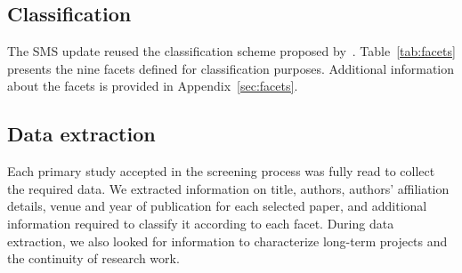 

\subsection{Classification}
The SMS update reused the classification scheme 
proposed by~\citet{2015:CSE:nascimento}.
Table~\ref{tab:facets} presents the nine facets defined for classification purposes.
Additional information about the facets is provided in Appendix~\ref{sec:facets}.

\subsection{Data extraction}
Each primary study accepted in the screening process 
was fully read to collect the required data. 
We extracted information on title, authors, 
authors' affiliation details, 
venue and year of publication for each selected paper, 
and additional information required to classify it 
according to each facet. 
During data extraction, we also looked for information 
to characterize long-term projects and 
the continuity of research work.

